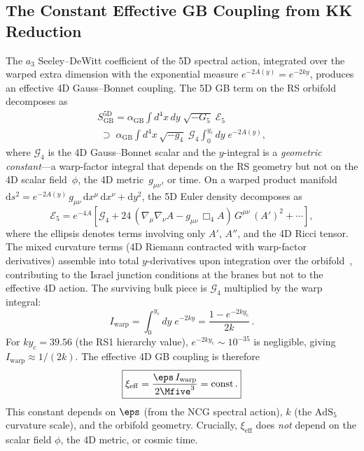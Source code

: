 \subsection{The Constant Effective GB Coupling from KK Reduction}
\label{sec:1-alphaT-kk}

The $a_3$ Seeley--DeWitt coefficient of the 5D spectral action, integrated over the warped extra dimension with the exponential measure $e^{-2A(y)} = e^{-2ky}$, produces an effective 4D Gauss--Bonnet coupling. The 5D GB term on the RS orbifold decomposes as
\begin{multline}
\label{eq:1-gb-kk-decomp}
S_{\mathrm{GB}}^{5\mathrm{D}} = \alpha_{\mathrm{GB}} \!\int\! d^4x\, dy\; \sqrt{-G_5}\; \mathcal{E}_5 \\
  \;\supset\; \alpha_{\mathrm{GB}} \!\int\! d^4x\, \sqrt{-g_4}\; \mathcal{G}_4 \!\int_0^{y_c}\! dy\; e^{-2A(y)},
\end{multline}
where $\mathcal{G}_4$ is the 4D Gauss--Bonnet scalar and the $y$-integral is a \emph{geometric constant}---a warp-factor integral that depends on the RS geometry but not on the 4D scalar field~$\phi$, the 4D metric~$g_{\mu\nu}$, or time. On a warped product manifold $\mathrm{d}s^2 = e^{-2A(y)}\,g_{\mu\nu}\,\mathrm{d}x^\mu\,\mathrm{d}x^\nu + \mathrm{d}y^2$, the 5D Euler density decomposes as~\cite{ch1:charmousis-dufaux2002}
\begin{equation}
\label{eq:1-e5-decomposition}
\mathcal{E}_5 = e^{-4A}\!\left[\mathcal{G}_4 + 24\,(\nabla_\mu\nabla_\nu A - g_{\mu\nu}\,\Box_4 A)\,G^{\mu\nu}\,(A')^2 + \cdots\right],
\end{equation}
where the ellipsis denotes terms involving only $A'$, $A''$, and the 4D Ricci tensor. The mixed curvature terms (4D Riemann contracted with warp-factor derivatives) assemble into total $y$-derivatives upon integration over the orbifold~\cite{ch1:davis2002}, contributing to the Israel junction conditions at the branes but not to the effective 4D action. The surviving bulk piece is $\mathcal{G}_4$ multiplied by the warp integral:
\begin{equation}
\label{eq:1-Iwarp}
I_{\mathrm{warp}} = \int_0^{y_c} dy\; e^{-2ky} = \frac{1 - e^{-2ky_c}}{2k}\,.
\end{equation}
For $ky_c = 39.56$ (the RS1 hierarchy value), $e^{-2ky_c} \sim 10^{-35}$ is negligible, giving $I_{\mathrm{warp}} \approx 1/(2k)$. The effective 4D GB coupling is therefore
\begin{equation}
\label{eq:1-xieff}
\boxed{\xi_{\mathrm{eff}} = \frac{\eps\, I_{\mathrm{warp}}}{2\Mfive^3} = \mathrm{const}\,.}
\end{equation}
This constant depends on $\eps$ (from the NCG spectral action), $k$ (the $\mathrm{AdS}_5$ curvature scale), and the orbifold geometry. Crucially, $\xi_{\mathrm{eff}}$ does \emph{not} depend on the scalar field $\phi$, the 4D metric, or cosmic time.

